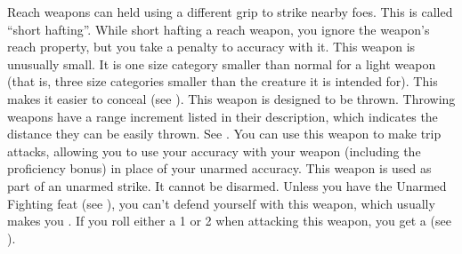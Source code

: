         Reach weapons can held using a different grip to strike nearby foes. This is called ``short hafting''. While short hafting a reach weapon, you ignore the weapon's reach property, but you take a  penalty to accuracy with it.
         This weapon is unusually small. It is one size category smaller than normal for a light weapon (that is, three size categories smaller than the creature it is intended for). This makes it easier to conceal (see ).
         This weapon is designed to be thrown. Throwing weapons have a range increment listed in their description, which indicates the distance they can be easily thrown. See .
         You can use this weapon to make trip attacks, allowing you to use your accuracy with your weapon (including the  proficiency bonus) in place of your unarmed accuracy.
         This weapon is used as part of an unarmed strike. It cannot be disarmed. Unless you have the Unarmed Fighting feat (see ), you can't defend yourself with this weapon, which usually makes you .
         If you roll either a 1 or 2 when attacking this weapon, you get a  (see ).

